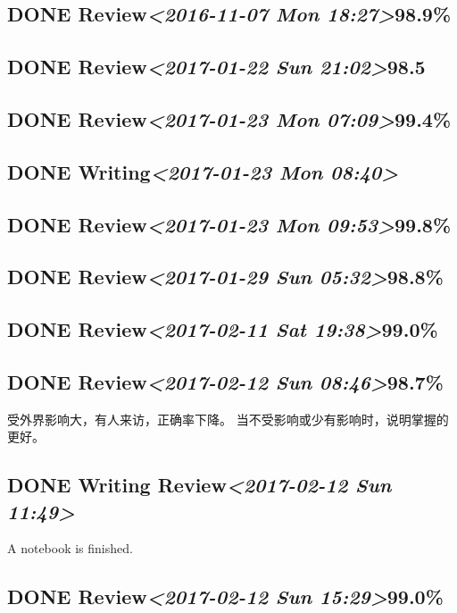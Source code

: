 \documentclass[11pt]{ctexart}
\begin{document}
\subsection{{\bfseries\sffamily DONE} Review\textit{<2016-11-07 Mon 18:27>}98.9\%}
\label{sec:org9f647ac}
\subsection{{\bfseries\sffamily DONE} Review\textit{<2017-01-22 Sun 21:02>}98.5}
\label{sec:orgeb1edf6}
\subsection{{\bfseries\sffamily DONE} Review\textit{<2017-01-23 Mon 07:09>}99.4\%}
\label{sec:orge6fcb96}
\subsection{{\bfseries\sffamily DONE} Writing\textit{<2017-01-23 Mon 08:40>}}
\label{sec:orge766d63}
\subsection{{\bfseries\sffamily DONE} Review\textit{<2017-01-23 Mon 09:53>}99.8\%}
\label{sec:org6f9ef2f}
\subsection{{\bfseries\sffamily DONE} Review\textit{<2017-01-29 Sun 05:32>}98.8\%}
\label{sec:org6f1a016}
\subsection{{\bfseries\sffamily DONE} Review\textit{<2017-02-11 Sat 19:38>}99.0\%}
\label{sec:org46bcbb3}
\subsection{{\bfseries\sffamily DONE} Review\textit{<2017-02-12 Sun 08:46>}98.7\%}
\label{sec:org0be4f5a}
受外界影响大，有人来访，正确率下降。
当不受影响或少有影响时，说明掌握的更好。
\subsection{{\bfseries\sffamily DONE} Writing Review\textit{<2017-02-12 Sun 11:49>}}
\label{sec:orgf240195}
A notebook is finished.
\subsection{{\bfseries\sffamily DONE} Review\textit{<2017-02-12 Sun 15:29>}99.0\%}
\label{sec:org65e6572}
\end{document}
